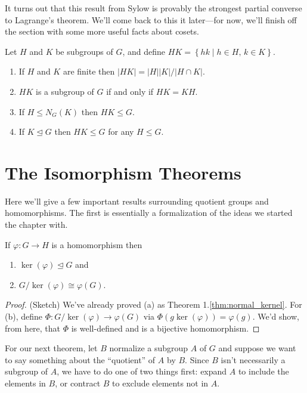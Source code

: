 \documentclass[../m171main.tex]{subfiles}
\begin{document}
It turns out that this result from Sylow is provably the strongest partial converse to Lagrange's theorem.
We'll come back to this it later---for now, we'll finish off the section with some more useful facts about cosets.

\begin{theorem}[]
    Let $H$ and $K$ be subgroups of $G$, and define $HK = \left\{ hk \mid h \in H, \, k \in K \right\}$.
    \begin{enumerate}[label=(\alph*)]
        \item If $H$ and $K$ are finite then $|HK| = |H| |K| / |H \cap K|$.
        \item $HK$ is a subgroup of $G$ if and only if $HK = KH$.
        \item If $H \leq N_G(K)$ then $HK \leq G$.
        \item If $K \trianglelefteq G$ then $HK \leq G$ for any $H \leq G$.
    \end{enumerate}
\end{theorem}

\section{The Isomorphism Theorems}
Here we'll give a few important results surrounding quotient groups and homomorphisms.
The first is essentially a formalization of the ideas we started the chapter with.

\begin{theorem}
    If $\varphi : G \to H$ is a homomorphism then
    \begin{enumerate}[label=(\alph*)]
        \item $\ker(\varphi) \trianglelefteq G$ and
        \item $G / \ker(\varphi) \cong \varphi(G)$.
    \end{enumerate}
\end{theorem}

\begin{proof}
    (Sketch)
    We've already proved (a) as Theorem 1.\ref{thm:normal_kernel}.
    For (b), define $\Phi : G / \ker (\varphi) \to \varphi(G)$ via $\Phi(g \ker (\varphi)) = \varphi(g)$.
    We'd show, from here, that $\Phi$ is well-defined and is a bijective homomorphism.
\end{proof}

For our next theorem, let $B$ normalize a subgroup $A$ of $G$ and suppose we want to say something about the ``quotient'' of $A$ by $B$.
Since $B$ isn't necessarily a subgroup of $A$, we have to do one of two things first: expand $A$ to include the elements in $B$, or contract $B$ to exclude elements not in $A$.
\end{document}
